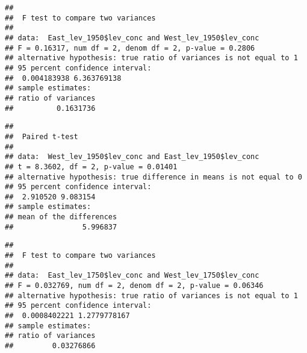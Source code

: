 \documentclass[]{article}
\newenvironment{Shaded}{\begin{snugshade}}{\end{snugshade}}
\newcommand{\KeywordTok}[1]{\textcolor[rgb]{0.13,0.29,0.53}{\textbf{#1}}}
\newcommand{\DataTypeTok}[1]{\textcolor[rgb]{0.13,0.29,0.53}{#1}}
\newcommand{\DecValTok}[1]{\textcolor[rgb]{0.00,0.00,0.81}{#1}}
\newcommand{\OtherTok}[1]{\textcolor[rgb]{0.56,0.35,0.01}{#1}}
\newcommand{\OperatorTok}[1]{\textcolor[rgb]{0.81,0.36,0.00}{\textbf{#1}}}
\newcommand{\NormalTok}[1]{#1}
\begin{document}
\begin{verbatim}
## 
##  F test to compare two variances
## 
## data:  East_lev_1950$lev_conc and West_lev_1950$lev_conc
## F = 0.16317, num df = 2, denom df = 2, p-value = 0.2806
## alternative hypothesis: true ratio of variances is not equal to 1
## 95 percent confidence interval:
##  0.004183938 6.363769138
## sample estimates:
## ratio of variances 
##          0.1631736
\end{verbatim}

\begin{Shaded}
\end{Shaded}

\begin{verbatim}
## 
##  Paired t-test
## 
## data:  West_lev_1950$lev_conc and East_lev_1950$lev_conc
## t = 8.3602, df = 2, p-value = 0.01401
## alternative hypothesis: true difference in means is not equal to 0
## 95 percent confidence interval:
##  2.910520 9.083154
## sample estimates:
## mean of the differences 
##                5.996837
\end{verbatim}

\begin{Shaded}
\end{Shaded}

\begin{verbatim}
## 
##  F test to compare two variances
## 
## data:  East_lev_1750$lev_conc and West_lev_1750$lev_conc
## F = 0.032769, num df = 2, denom df = 2, p-value = 0.06346
## alternative hypothesis: true ratio of variances is not equal to 1
## 95 percent confidence interval:
##  0.0008402221 1.2779778167
## sample estimates:
## ratio of variances 
##         0.03276866
\end{verbatim}

\begin{Shaded}
\end{Shaded}
\end{document}
